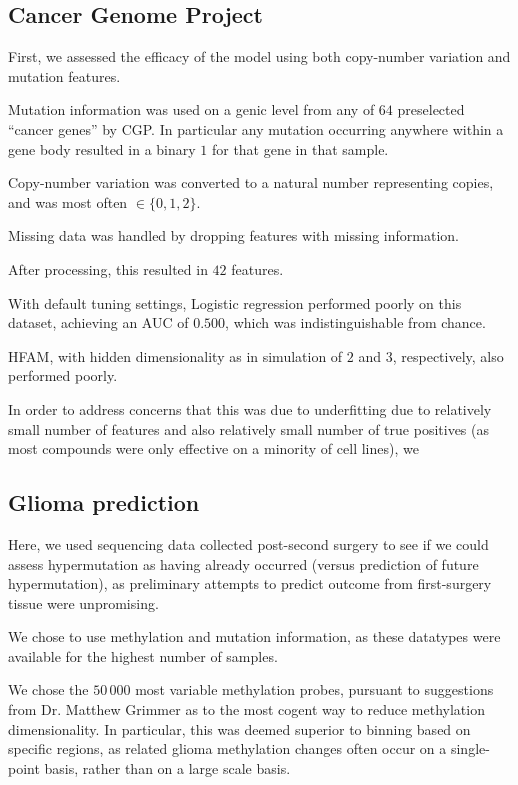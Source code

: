 \subsection{Cancer Genome Project}

First, we assessed the efficacy of the model using both copy-number variation and mutation features. 

Mutation information was used on a genic level from any of $64$ preselected ``cancer genes'' by CGP. In particular any mutation occurring anywhere within a gene body resulted in a binary $1$ for that gene in that sample.

Copy-number variation was converted to a natural number representing copies, and was most often $\in \{0,1,2\}$.

Missing data was handled by dropping features with missing information.

After processing, this resulted in $42$ features.

With default tuning settings, Logistic regression performed poorly on this dataset, achieving an AUC of $0.500$, which was indistinguishable from chance.

HFAM, with hidden dimensionality as in simulation of $2$ and $3$, respectively, also performed poorly.

In order to address concerns that this was due to underfitting due to relatively small number of features and also relatively small number of true positives (as most compounds were only effective on a minority of cell lines), we 



\subsection{Glioma prediction}

Here, we used sequencing data collected post-second surgery to see if we could assess hypermutation as having already occurred (versus prediction of future hypermutation), as preliminary attempts to predict outcome from first-surgery tissue were unpromising.

We chose to use methylation and mutation information, as these datatypes were available for the highest number of samples.

We chose the $50\,000$ most variable methylation probes, pursuant to suggestions from Dr. Matthew Grimmer as to the most cogent way to reduce methylation dimensionality. In particular, this was deemed superior to binning based on specific regions, as related glioma methylation changes often occur on a single-point basis, rather than on a large scale basis.

